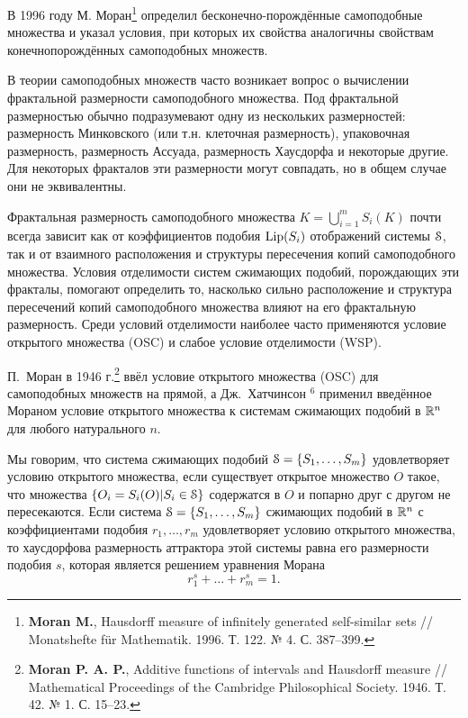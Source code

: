 \documentclass[a5paper,9pt,twoside]{extarticle} %
\begin{document}
В 1996 году М. Моран\footnote{{\bf Moran M.}, Hausdorff measure of infinitely generated self-similar sets // Monatshefte für Mathematik. 1996. Т. 122. № 4. С. 387--399.} определил бесконечно-порождённые самоподобные множества и указал условия, при которых их свойства аналогичны свойствам конечнопорождённых самоподобных множеств.

В теории самоподобных множеств часто возникает вопрос о вычислении фрактальной размерности самоподобного множества.
Под фрактальной размерностью обычно подразумевают одну из нескольких размерностей: размерность Минковского (или т.н. клеточная размерность), упаковочная размерность, размерность Ассуада, размерность Хаусдорфа и некоторые другие.
Для некоторых фракталов эти размерности могут совпадать, но в общем случае они не эквивалентны.

Фрактальная размерность самоподобного множества $K=\bigcup_{i=1}^mS_i(K)$ почти всегда зависит как от коэффициентов подобия $\mathop{\rm Lip} \nolimits(S_i)$ отображений системы ${\EuScript S}$, так и от взаимного расположения и структуры пересечения копий самоподобного множества.
Условия отделимости систем сжимающих подобий, порождающих эти фракталы, помогают определить то, насколько сильно расположение и структура пересечений копий самоподобного множества влияют на его фрактальную размерность.
Среди условий отделимости наиболее часто применяются условие открытого множества (OSC) и слабое условие отделимости (WSP).

П.~Моран в 1946 г.\footnote{{\bf Moran P. A. P.}, Additive functions of intervals and Hausdorff measure // Mathematical Proceedings of the Cambridge Philosophical Society. 1946. Т. 42. № 1. С. 15–23.} ввёл условие открытого множества (OSC) для самоподобных множеств на прямой, а Дж.~Хатчинсон $^6$ применил введённое Мораном условие открытого множества к системам сжимающих подобий в $\mathbb{R}^n$ для любого натурального $n$.

Мы говорим, что система сжимающих подобий \linebreak ${\EuScript S}=\{S_1, \ldots, S_m\}$ удовлетворяет условию открытого множества, если существует открытое множество $O$ такое, что множества $\{O_i=S_i(O) | S_i\in{\EuScript S}\}$ содержатся в $O$ и попарно друг с другом не пересекаются.
Если система ${\EuScript S}=\{S_1,\ldots,S_m\}$ сжимающих подобий в $\mathbb{R}^n$ с коэффициентами подобия $r_1, \ldots, r_m$ удовлетворяет условию открытого множества, то хаусдорфова размерность аттрактора этой системы равна его размерности подобия $s$, которая является решением уравнения Морана
$$r_1^s+\ldots+r_m^s=1.$$
\end{document}
